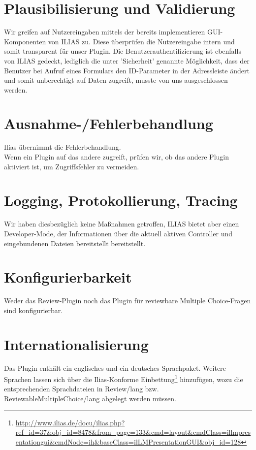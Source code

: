 \documentclass[a4paper]{scrreprt}
\begin{document}
\section{Plausibilisierung und Validierung}

Wir greifen auf Nutzereingaben mittels der bereits implementieren GUI-Komponenten von ILIAS zu. 
Diese überprüfen die Nutzereingabe intern und somit transparent für unser Plugin. 
Die Benutzerauthentifizierung ist ebenfalls von ILIAS gedeckt, lediglich die unter 'Sicherheit' genannte Möglichkeit, dass der Benutzer bei Aufruf eines Formulars den ID-Parameter in der Adressleiste ändert und somit unberechtigt auf Daten zugreift, musste von uns ausgeschlossen werden.

\section{Ausnahme-/Fehlerbehandlung}

Ilias übernimmt die Fehlerbehandlung.\\
Wenn ein Plugin auf das andere zugreift, prüfen wir, ob das andere Plugin aktiviert ist, um Zugriffsfehler zu vermeiden.

\section{Logging, Protokollierung, Tracing}

Wir haben diesbezüglich keine Maßnahmen getroffen, ILIAS bietet aber einen Developer-Mode, der Informationen über die aktuell aktiven Controller und eingebundenen Dateien bereitstellt bereitstellt.

\section{Konfigurierbarkeit}

Weder das Review-Plugin noch das Plugin für reviewbare Multiple Choice-Fragen sind konfigurierbar.

\section{Internationalisierung}

Das Plugin enthält ein englisches und ein deutsches Sprachpaket. 
Weitere Sprachen lassen sich über die Ilias-Konforme Einbettung\footnote{\url{http://www.ilias.de/docu/ilias.php?ref_id=37&obj_id=8478&from_page=133&cmd=layout&cmdClass=illmpresentationgui&cmdNode=ih&baseClass=ilLMPresentationGUI&obj_id=128}} 
 hinzufügen, wozu die entsprechenden Sprachdateien in Review/lang bzw. 
ReviewableMultipleChoice/lang abgelegt werden müssen.
\end{document}
